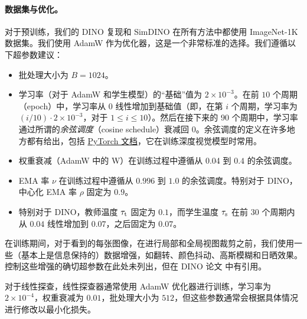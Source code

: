 \documentclass[../../book-main.tex]{subfiles}
\begin{document}
\paragraph{数据集与优化。} 对于预训练，我们的 DINO 复现和 SimDINO 在所有方法中都使用 ImageNet-1K 数据集。我们使用 AdamW \citep{Loshchilov2017DecoupledWD} 作为优化器，这是一个非常标准的选择。我们遵循以下超参数建议：
\begin{itemize}
    \item 批处理大小为 \(B = 1024\)。
    \item 学习率（对于 AdamW 和学生模型）的“基础”值为 \(2 \times 10^{-3}\)。在前 \(10\) 个周期（epoch）中，学习率从 \(0\) 线性增加到基础值（即，在第 \(i\) 个周期，学习率为 \((i/10) \cdot 2 \times 10^{-3}\)，对于 \(1 \leq i \leq 10\)）。然后在接下来的 \(90\) 个周期中，学习率通过所谓的\textit{余弦调度}（cosine schedule）衰减回 \(0\)。余弦调度的定义在许多地方都有给出，包括 \href{https://pytorch.org/docs/stable/generated/torch.optim.lr_scheduler.CosineAnnealingLR.html}{PyTorch 文档}，它在训练深度视觉模型时常用。
    \item 权重衰减（AdamW 中的 W）在训练过程中遵循从 0.04 到 \(0.4\) 的余弦调度。
    \item EMA 率 \(\nu\) 在训练过程中遵循从 \(0.996\) 到 \(1.0\) 的余弦调度。特别对于 DINO，中心化 EMA 率 \(\rho\) 固定为 \(0.9\)。
    \item 特别对于 DINO，教师温度 \(\tau_{\mathrm{t}}\) 固定为 \(0.1\)，而学生温度 \(\tau_{\mathrm{s}}\) 在前 \(30\) 个周期内从 \(0.04\) 线性增加到 \(0.07\)，之后固定为 \(0.07\)。
\end{itemize}
在训练期间，对于看到的每张图像，在进行局部和全局视图裁剪之前，我们使用一些（基本上是信息保持的）数据增强，如翻转、颜色抖动、高斯模糊和日晒效果。控制这些增强的确切超参数在此处未列出，但在 DINO 论文 \citep{caron2021emerging} 中有引用。

对于线性探查，线性探查器通常使用 AdamW 优化器进行训练，学习率为 \(2 \times 10^{-4}\)，权重衰减为 \(0.01\)，批处理大小为 \(512\)，但这些参数通常会根据具体情况进行修改以最小化损失。
\end{document}
